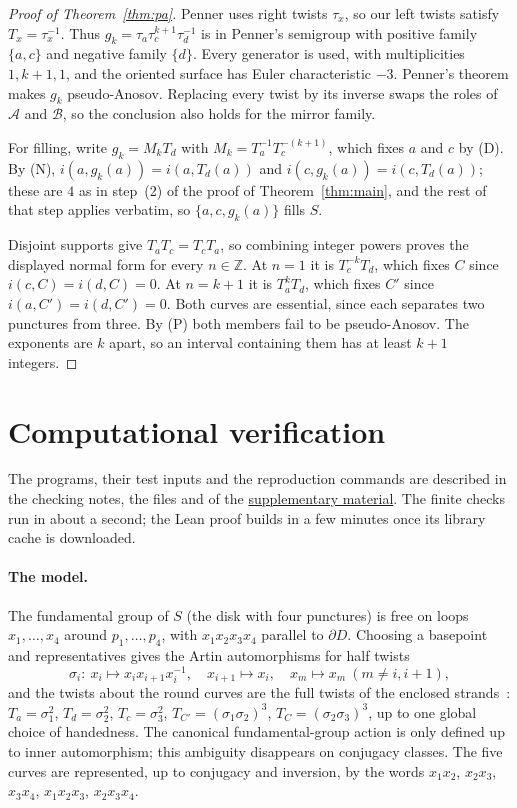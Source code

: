 \documentclass[11pt]{article}
\theoremstyle{remark}
\newcommand{\Z}{\mathbb{Z}}
\newcommand{\file}[1]{\texttt{\detokenize{#1}}}
\begin{document}
\begin{proof}[Proof of Theorem~\ref{thm:pa}]
Penner uses right twists $\tau_x$, so our left twists satisfy
$T_x=\tau_x^{-1}$. Thus
$g_k=\tau_a\tau_c^{k+1}\tau_d^{-1}$ is in Penner's semigroup with positive
family $\{a,c\}$ and negative family $\{d\}$. Every generator is used,
with multiplicities $1,k+1,1$, and the oriented surface has Euler
characteristic $-3$. Penner's theorem makes $g_k$
pseudo-Anosov. Replacing every twist by its inverse swaps the roles of
$\mathcal A$ and $\mathcal B$, so the conclusion also holds for the mirror family.

For filling, write $g_k=M_kT_d$ with $M_k=T_a^{-1}T_c^{-(k+1)}$, which
fixes $a$ and $c$ by (D). By (N), $i(a,g_k(a))=i(a,T_d(a))$ and
$i(c,g_k(a))=i(c,T_d(a))$; these are $4$ as in step~(2) of the proof of
Theorem~\ref{thm:main}, and the rest of that step applies verbatim, so
$\{a,c,g_k(a)\}$ fills $S$.

Disjoint supports give $T_aT_c=T_cT_a$, so combining integer powers
proves the displayed normal form for every $n\in\Z$. At $n=1$ it is
$T_c^{-k}T_d$, which fixes $C$ since $i(c,C)=i(d,C)=0$.
At $n=k+1$ it is $T_a^kT_d$, which fixes $C'$ since
$i(a,C')=i(d,C')=0$. Both curves are essential, since each separates
two punctures from three. By (P) both members fail to be pseudo-Anosov.
The exponents are $k$ apart, so an interval containing them has at least
$k+1$ integers.
\end{proof}

\section{Computational verification}\label{sec:checks}

The programs, their test inputs and the reproduction commands are
described in the checking notes, the files \file{checks/README.md} and
\file{lean/README.md} of the \href{https://github.com/6/clank-lab/tree/multitwist-exceptions-v4/results/multitwist-exceptions}{supplementary material}. The finite checks run in about a second; the Lean
proof builds in a few minutes once its library cache is downloaded.

\paragraph{The model.} The fundamental group of $S$ (the disk with four
punctures) is free on loops $x_1,\dots,x_4$ around $p_1,\dots,p_4$, with
$x_1x_2x_3x_4$ parallel to $\partial D$. Choosing a basepoint and representatives gives the Artin
automorphisms for half twists
\[
\sigma_i:\ x_i\mapsto x_ix_{i+1}x_i^{-1},\quad x_{i+1}\mapsto x_i,\quad
x_m\mapsto x_m\ (m\ne i,i+1),
\]
and the twists about the round curves are the full twists of the enclosed
strands~\cite[Ch.~9]{FM}: $T_a=\sigma_1^2$, $T_d=\sigma_2^2$, $T_c=\sigma_3^2$,
$T_{C'}=(\sigma_1\sigma_2)^3$, $T_C=(\sigma_2\sigma_3)^3$, up to one global
choice of handedness. The canonical fundamental-group action is only defined up to inner
automorphism; this ambiguity disappears on conjugacy classes. The five
curves are represented, up to conjugacy and inversion, by the words $x_1x_2$, $x_2x_3$, $x_3x_4$, $x_1x_2x_3$, $x_2x_3x_4$.
\end{document}
